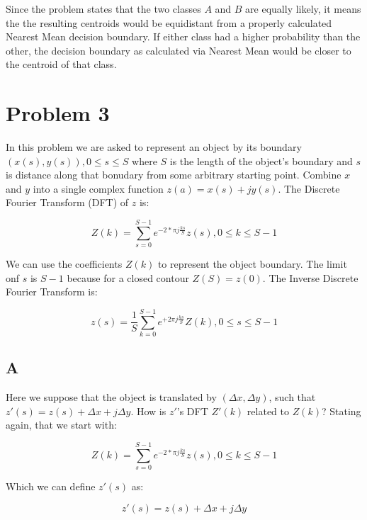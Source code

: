 \documentclass{article}
\begin{document}
Since the problem states that the two classes $A$ and $B$ are equally likely, it means the the resulting centroids would be equidistant from a properly calculated Nearest Mean decision boundary. If either class had a higher probability than the other, the decision boundary as calculated via Nearest Mean would be closer to the centroid of that class.



\section*{Problem 3}

In this problem we are asked to represent an object by its boundary $(x(s),y(s)),0\leq s\leq S$ where $S$ is the length of the object's boundary and $s$ is distance along that bonudary from some arbitrary starting point. Combine $x$ and $y$ into a single complex function $z(a)=x(s)+jy(s)$. The Discrete Fourier Transform (DFT) of $z$ is:

\begin{equation}
    Z(k) = \sum^{S-1}_{s=0} e^{-2*\pi j \frac{ks}{S}} z(s), 0\leq k \leq S-1
\end{equation}

We can use the coefficients $Z(k)$ to represent the object boundary. The limit onf $s$ is $S-1$ because for a closed contour $Z(S)=z(0)$. The Inverse Discrete Fourier Transform is:

\begin{equation}
    z(s) = \frac{1}{S} \sum_{k=0}^{S-1} e^{+2\pi j \frac{ks}{S}} Z(k), 0 \leq s \leq S-1
\end{equation}

\subsection*{A}

Here we suppose that the object is translated by $(\Delta x, \Delta y)$, such that $z'(s) = z(s) + \Delta x + j \Delta y$. How is $z'$'s DFT $Z'(k)$ related to $Z(k)$? Stating again, that we start with:

\begin{equation}
    Z(k) = \sum^{S-1}_{s=0} e^{-2*\pi j \frac{ks}{S}} z(s), 0\leq k \leq S-1
\end{equation}

\noindent Which we can define $z'(s)$ as:

\begin{equation}
    z'(s) = z(s) + \Delta x + j \Delta y
\end{equation}
\end{document}
